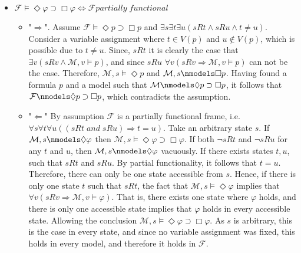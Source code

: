 \documentclass[11pt,a4paper]{article}
\newcommand{\lto}{\supset}
\newcommand{\some}{\Diamond}
\newcommand{\all}{\Box}
\newcommand{\sand}{\; and \;}
\newcommand{\sor}{ \; or \;}
\newcommand{\sto}{\Rightarrow}
\begin{document}
\begin{itemize}
\item $\mathcal{F} \models \some \varphi \lto \all \varphi \iff \mathcal{F} \mathit{partially \; functional}$ 
\begin{itemize}
\item "$\Rightarrow$". Assume $\mathcal{F} \models \some p \lto \all p $ and $\exists s \exists t \exists u (sRt \land sRu \land t \neq u)$. Consider a variable assignment where $t \in V(p)$ and $u \nin V(p)$, which is possible due to $t \neq u$. Since, $sRt$ it is clearly the case that $\exists v (sRv \land \mathcal{M}, v \models p)$, and since $sRu$ $\forall v (sRv \sto \mathcal{M}, v \models p)$ can not be the case. Therefore, $\mathcal{M}, s \models \some p$ and  $\mathcal{M}, s \nmodels \all p$. Having found a formula $p$ and a model such that $\mathcal{M} \nmodels  \some p \lto \all p$, it follows that $\mathcal{F} \nmodels  \some p \lto \all p$, which contradicts the assumption.
\item "$\Leftarrow$" By assumption $\mathcal{F}$ is a partially functional frame, i.e. \\
$\forall s \forall t \forall u ((sRt \sand sRu) \sto t = u)$. Take an arbitrary state $s$. If $\mathcal{M}, s \nmodels \some \varphi$ then $\mathcal{M},s \models \some \varphi \lto \all \varphi$. If both $\neg sRt$ and $\neg sRu$ for any $t$ and $u$, then $\mathcal{M}, s \nmodels \some \varphi$ vacuously. If there exists states $t,u$, such that $sRt$ and $sRu$. By partial functionality, it follows that $t = u$. Therefore, there can only be one state accessible from $s$. Hence, if there is only one state $t$ such that $sRt$, the fact that $\mathcal{M}, s \models \some \varphi$ implies that $\forall v (sRv \sto \mathcal{M}, v \models \varphi)$. That is, there exists one state where $\varphi$ holds, and there is only one accessible state implies that $\varphi$ holds in every accessible state. Allowing the conclusion $\mathcal{M},s \models \some \varphi \lto \all \varphi $. As $s$ is arbitrary, this is the case in every state, and since no variable assignment was fixed, this holds in every model, and therefore it holds in $\mathcal{F}$. 
\end{itemize}



\end{itemize}
\end{document}
